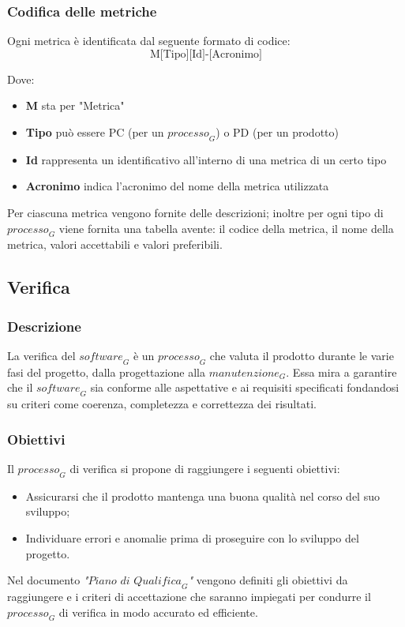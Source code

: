 \subsubsection{Codifica delle metriche}
Ogni metrica è identificata dal seguente formato di codice:
    \[
    \text{M[Tipo][Id]-[Acronimo]}
    \]

Dove:
\begin{itemize}
    \item \textbf{M} sta per "Metrica"
    \item \textbf{Tipo} può essere PC (per un $\textit{processo}_G$) o PD (per un prodotto)
    \item \textbf{Id} rappresenta un identificativo all'interno di una metrica di un certo tipo
    \item \textbf{Acronimo} indica l'acronimo del nome della metrica utilizzata
\end{itemize}
Per ciascuna metrica vengono fornite delle descrizioni; inoltre per ogni tipo di $\textit{processo}_G$ viene fornita una tabella avente: il codice della metrica, il nome della metrica, valori accettabili e valori preferibili.

\subsection{Verifica}
\subsubsection{Descrizione}
La verifica del $\textit{software}_G$ è un $\textit{processo}_G$ che valuta il prodotto durante le varie fasi del progetto, dalla progettazione alla $\textit{manutenzione}_G$. Essa mira a garantire che il $\textit{software}_G$ sia conforme alle aspettative e ai requisiti specificati fondandosi su criteri come coerenza, completezza e correttezza dei risultati.
\subsubsection{Obiettivi}
Il $\textit{processo}_G$ di verifica si propone di raggiungere i seguenti obiettivi:
\begin{itemize}
    \item Assicurarsi che il prodotto mantenga una buona qualità nel corso del suo sviluppo;
    \item Individuare errori e anomalie prima di proseguire con lo sviluppo del progetto.
\end{itemize}
Nel documento \emph{"$\textit{Piano di Qualifica}_G$"} vengono definiti gli obiettivi da raggiungere e i criteri di accettazione  che saranno impiegati per condurre il $\textit{processo}_G$ di verifica in modo accurato ed efficiente. 
